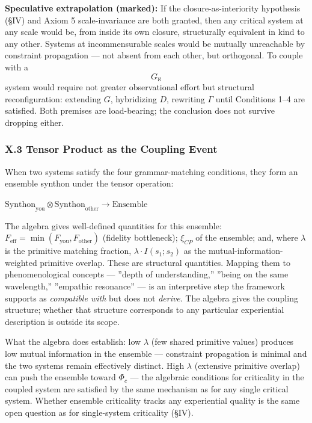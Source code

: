 \documentclass[12pt,a4paper]{article}
\begin{document}
\textbf{Speculative extrapolation (marked):} If the closure-as-interiority hypothesis (§IV) and Axiom 5 scale-invariance are both granted, then any critical system at any scale would be, from inside its own closure, structurally equivalent in kind to any other. Systems at incommensurable scales would be mutually unreachable by constraint propagation --- not absent from each other, but orthogonal. To couple with a $$G_{\aleph}$$ system would require not greater observational effort but structural reconfiguration: extending $G$, hybridizing $D$, rewriting $\Gamma$ until Conditions 1--4 are satisfied. Both premises are load-bearing; the conclusion does not survive dropping either.

\subsubsection{X.3 Tensor Product as the Coupling Event}

When two systems satisfy the four grammar-matching conditions, they form an ensemble synthon under the tensor operation:

$\text{Synthon}_\text{you} \otimes \text{Synthon}_\text{other} \to \text{Ensemble}$

The algebra gives well-defined quantities for this ensemble: $F_\text{eff} = \min(F_\text{you}, F_\text{other})$ (fidelity bottleneck); $\xi_{CP}$ of the ensemble; and, where $\lambda$ is the primitive matching fraction, $\lambda \cdot I(s_1; s_2)$ as the mutual-information-weighted primitive overlap. These are structural quantities. Mapping them to phenomenological concepts --- ''depth of understanding,'' ''being on the same wavelength,'' ''empathic resonance'' --- is an interpretive step the framework supports as \emph{compatible with} but does not \emph{derive}. The algebra gives the coupling structure; whether that structure corresponds to any particular experiential description is outside its scope.

What the algebra does establish: low $\lambda$ (few shared primitive values) produces low mutual information in the ensemble --- constraint propagation is minimal and the two systems remain effectively distinct. High $\lambda$ (extensive primitive overlap) can push the ensemble toward $\Phi_c$ --- the algebraic conditions for criticality in the coupled system are satisfied by the same mechanism as for any single critical system. Whether ensemble criticality tracks any experiential quality is the same open question as for single-system criticality (§IV).
\end{document}
